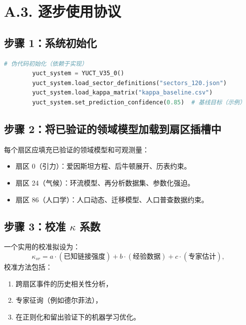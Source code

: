 \documentclass[11pt,a4paper]{article}
\begin{document}
	\section*{A.3. 逐步使用协议}
	
	\subsection*{步骤 1：系统初始化}
	\begin{lstlisting}[language=Python]
		# 伪代码初始化（依赖于实现）
		yuct_system = YUCT_V35_0()
		yuct_system.load_sector_definitions("sectors_120.json")
		yuct_system.load_kappa_matrix("kappa_baseline.csv")
		yuct_system.set_prediction_confidence(0.85)  # 基线目标（示例）
	\end{lstlisting}
	
	\subsection*{步骤 2：将已验证的领域模型加载到扇区插槽中}
	每个扇区应填充已验证的领域模型和可观测量：
	\begin{itemize}[leftmargin=*]
		\item 扇区 0（引力）：爱因斯坦方程、后牛顿展开、历表约束。
		\item 扇区 24（气候）：环流模型、再分析数据集、参数化强迫。
		\item 扇区 86（人口学）：人口动态、迁移模型、人口普查数据约束。
	\end{itemize}
	
	\subsection*{步骤 3：校准 $\kappa$ 系数}
	一个实用的校准拟设为：
	\[
	\kappa_{sr} = a\cdot (\text{已知链接强度}) + b\cdot (\text{经验数据}) + c\cdot (\text{专家估计}),
	\]
	校准方法包括：
	\begin{enumerate}[leftmargin=*]
		\item 跨扇区事件的历史相关性分析，
		\item 专家征询（例如德尔菲法），
		\item 在正则化和留出验证下的机器学习优化。
	\end{enumerate}
	
\end{document}
